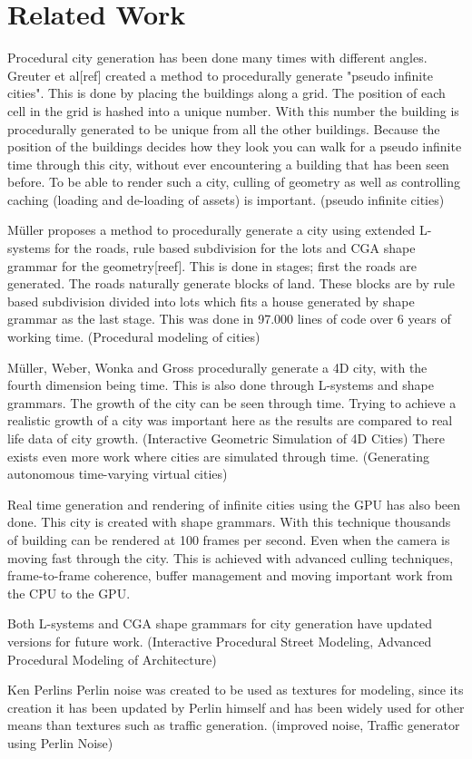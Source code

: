 \section{Related Work}
Procedural city generation has been done many times with different angles. Greuter et al[ref] created a method to procedurally generate "pseudo infinite cities". This is done by placing the buildings along a grid. The position of each cell in the grid is hashed into a unique number. With this number the building is procedurally generated to be unique from all the other buildings. Because the position of the buildings decides how they look you can walk for a pseudo infinite time through this city, without ever encountering a building that has been seen before. To be able to render such a city, culling of geometry as well as controlling caching (loading and de-loading of assets) is important. (pseudo infinite cities)

\par 
Müller proposes a method to procedurally generate a city using extended L-systems for the roads, rule based subdivision for the lots and CGA shape grammar for the geometry[reef]. This is done in stages; first the roads are generated. The roads naturally generate blocks of land. These blocks are by rule based subdivision divided into lots which fits a house generated by shape grammar as the last stage. This was done in 97.000 lines of code over 6 years of working time. (Procedural modeling of cities)

\par
Müller, Weber, Wonka and Gross procedurally generate a 4D city, with the fourth dimension being time. This is also done through L-systems and shape grammars. The growth of the city can be seen through time. Trying to achieve a realistic growth of a city was important here as the results are compared to real life data of city growth. (Interactive Geometric Simulation of 4D Cities) There exists even more work where cities are simulated through time. (Generating autonomous time-varying virtual cities)

\par
Real time generation and rendering of infinite cities using the GPU has also been done. This city is created with shape grammars. With this technique thousands of building can be rendered at 100 frames per second. Even when the camera is moving fast through the city. This is achieved with advanced culling techniques, frame-to-frame coherence, buffer management and moving important work from the CPU to the GPU.

\par
Both L-systems and CGA shape grammars for city generation have updated versions for future work. (Interactive Procedural Street Modeling, Advanced Procedural Modeling of Architecture)

\par
Ken Perlins Perlin noise was created to be used as textures for modeling, since its creation it has been updated by Perlin himself and has been widely used for other means than textures such as traffic generation. (improved noise, Traffic generator using Perlin Noise)